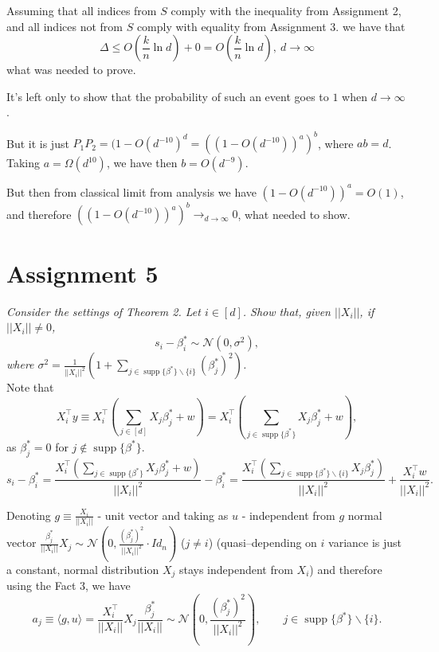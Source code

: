 \documentclass[]{article}
\DeclareMathOperator\supp{supp}
\begin{document}
Assuming that all indices from $S$ comply with the inequality from Assignment 2, and all indices not from $S$ comply with equality from Assignment 3. we have that
$$\Delta \le O\left(\frac{k}{n}\ln d\right) + 0 = O\left(\frac{k}{n}\ln d\right), \:d\rightarrow\infty$$ 
what was needed to prove.

It's left only to show that the probability of such an event goes to $1$ when $d\rightarrow \infty$.

But it is just 
$P_1P_2= (1-O(d^{-10})^d =
\left((1-O(d^{-10}))^{a}\right)^{b}$, where $ab=d$. Taking $a=\Omega(d^{10})$, we have then $b=O(d^{-9})$.

But then from classical limit from analysis we have 
$(1-O(d^{-10}))^{a} = O(1)$, and therefore\newline
$\left((1-O(d^{-10}))^{a}\right)^{b} \rightarrow_{d\rightarrow \infty} 0$, what needed to show.
\fi
\section*{Assignment 5}
\textit{Consider the settings of Theorem 2. Let $i\in [d]$. Show that, given $||X_i||$, if $||X_i||\ne0$,
$$s_i-\beta_i^* \sim \mathcal{N}(0, \sigma^2),$$
where $\sigma^2 = \frac{1}{||X_i||^2}\left(1+\sum_{j\in\supp\{\beta^*\}\backslash \{i\}}(\beta_j^*)^2\right)$.}\\

Note that
$$X_i^\top y \equiv X_i^\top\left(\sum_{j\in[d]}X_j\beta_j^* + w\right) = X_i^\top\left(\sum_{j\in\supp\{\beta^*\}}X_j\beta_j^*+w\right),$$
as $\beta_j^*=0$ for $j\notin\supp\{\beta^*\}$.
$$s_i-\beta_i^* = \frac{X_i^\top\left(\sum_{j\in\supp\{\beta^*\}} X_j\beta_j^* + w\right)}{||X_i||^2}-\beta_i^*=\frac{X_i^\top\left(\sum_{j\in\supp\{\beta^*\}\backslash\{i\}} X_j\beta_j^*\right)}{||X_i||^2} + \frac{X_i^\top w}{||X_i||^2}.$$

Denoting $g\equiv\frac{X_i}{||X_i||}$ - unit vector and taking as $u$ - independent from $g$ normal vector $\frac{\beta_j^*}{||X_i||} X_j\sim\mathcal{N}\left(0, \frac{(\beta_j^*)^2}{||X_i||^2}\cdot Id_n\right)$ ($j\ne i$) (quasi--depending on $i$ variance is just a constant, normal distribution $X_j$ stays independent from $X_i$) and therefore using the Fact 3, we have $$a_j\equiv\langle g, u\rangle = \frac{X_i^\top}{||X_i||} X_j\frac{\beta_j^*}{||X_i||}\sim\mathcal{N}\left(0, \frac{(\beta_j^*)^2}{||X_i||^2}\right), \qquad j\in\supp\{\beta^*\}\backslash \{i\}.$$
\end{document}
